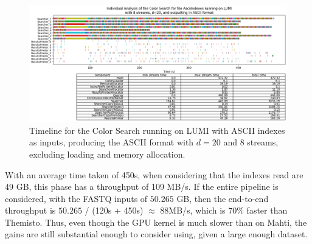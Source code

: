\begin{figure}[t]
  \centering
  \includegraphics[width=\textwidth]{images/LumiColorASCIID20S8ASCII.png}
  \caption{Timeline for the Color Search running on LUMI with ASCII indexes as inputs, producing the ASCII format with $d=20$ and 8 streams, excluding loading and memory allocation.}\label{fig:LumiColorASCIID20S8ASCII}
\end{figure}

With an average time taken of 450s, when considering that the indexes read are 49 GB, this phase has a throughput of 109 MB/s.
If the entire pipeline is considered, with the FASTQ inputs of $50.265$ GB, then the end-to-end throughput is $50.265$ / (120s + 450s) $\approx$ 88MB/s, which is 70\% faster than Themisto.
Thus, even though the GPU kernel is much slower than on Mahti, the gains are still substantial enough to consider using, given a large enough dataset.
